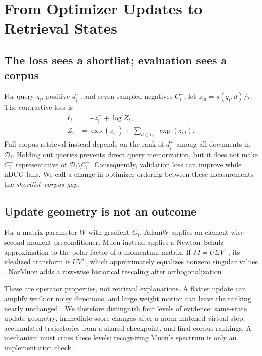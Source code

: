 \documentclass[11pt]{article}
\begin{document}
\section{From Optimizer Updates to Retrieval States}

\subsection{The loss sees a shortlist; evaluation sees a corpus}

For query $q_i$, positive $d_i^+$, and seven sampled negatives $C_i^-$, let
$z_{id}=s(q_i,d)/\tau$. The contrastive loss is
\begin{align}
\ell_i &= -z_i^+ + \log Z_i, \\
Z_i &= \exp(z_i^+) + \sum_{d\in C_i^-}\exp(z_{id}).
\end{align}
Full-corpus retrieval instead depends on the rank of $d_i^+$ among all documents in
$\mathcal D_i$. Holding out queries prevents direct query memorization, but it does not make
$C_i^-$ representative of $\mathcal D_i\setminus C_i^-$. Consequently, validation loss can improve
while nDCG falls. We call a change in optimizer ordering between these measurements the
\emph{shortlist--corpus gap}.

\subsection{Update geometry is not an outcome}

For a matrix parameter $W$ with gradient $G_t$, AdamW applies an element-wise second-moment
preconditioner. Muon instead applies a Newton--Schulz approximation to the polar factor of a momentum
matrix. If $M=U\Sigma V^\top$, its idealized transform is $UV^\top$, which approximately equalizes
nonzero singular values \citep{jordan2024muon}. NorMuon adds a row-wise historical rescaling after
orthogonalization \citep{li2025normuon}.

These are operator properties, not retrieval explanations. A flatter update can amplify weak or
noisy directions, and large weight motion can leave the ranking nearly unchanged
\citep{pang2026htmuon,qu2026finetune}. We therefore distinguish four levels of evidence:
same-state update geometry, immediate score changes after a norm-matched virtual step, accumulated
trajectories from a shared checkpoint, and final corpus rankings. A mechanism must cross these
levels; recognizing Muon's spectrum is only an implementation check.
\end{document}
